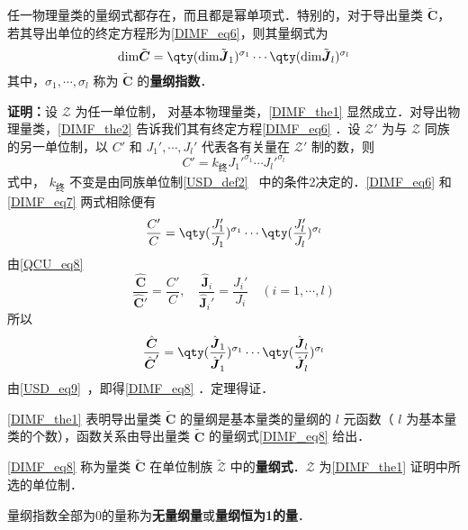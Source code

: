 \begin{theorem}{}\label{DIMF_the1}
任一物理量类的量纲式都存在，而且都是幂单项式．特别的，对于导出量类 $\tilde{\boldsymbol{C}}$，若其导出单位的终定方程形为\autoref{DIMF_eq6}，则其量纲式为
\begin{equation}\label{DIMF_eq8}
\mathrm{dim}\tilde{\boldsymbol{C}}=\qty(\mathrm{dim}\tilde{\boldsymbol{J}}_1)^{\sigma_1}\cdots\qty(\mathrm{dim}\tilde{\boldsymbol{J}}_l)^{\sigma_l}
\end{equation}
其中，$\sigma_1,\cdots,\sigma_l$ 称为 $\tilde{\boldsymbol{C}}$ 的\textbf{量纲指数}．
\end{theorem}
\textbf{证明：}设 $\mathscr{Z}$ 为任一单位制， 对基本物理量类，\autoref{DIMF_the1} 显然成立．对导出物理量类，\autoref{DIMF_the2} 告诉我们其有终定方程\autoref{DIMF_eq6} ．设 $\mathscr{Z'}$ 为与 $\mathscr{Z}$ 同族的另一单位制，以 $C'$ 和 $J_1',\cdots,J_l'$ 代表各有关量在 $\mathscr{Z'}$ 制的数，则
\begin{equation}\label{DIMF_eq7}
C'=k_{\text{终}}J_1'^{\sigma_1}\cdots J_l'^{\sigma_l}
\end{equation}
 式中， $k_{\text{终}}$ 不变是由同族单位制\autoref{USD_def2}~ 中的条件2决定的．\autoref{DIMF_eq6} 和\autoref{DIMF_eq7} 两式相除便有
 \begin{equation}
 \frac{C'}{C}=\qty(\frac{J_1'}{J_1})^{\sigma_1}\cdots\qty(\frac{J_l'}{J_l})^{\sigma_l}
 \end{equation}
 由\autoref{QCU_eq8}~
 \begin{equation}
 \frac{\hat{\boldsymbol{C}}}{\hat{\boldsymbol{C}}'}=\frac{C'}{C}, \quad\frac{\hat{\boldsymbol{J}}_i}{\hat{\boldsymbol{J}}_i'}=\frac{J_i'}{J_i}\quad (i=1,\cdots ,l)
 \end{equation}
 所以
 \begin{equation}
 \frac{\hat{\boldsymbol{C}}}{\hat{\boldsymbol{C}}'}=\qty(\frac{\hat{\boldsymbol{J}}_1}{\hat{\boldsymbol{J}}_1'})^{\sigma_1}\cdots\qty(\frac{\hat{\boldsymbol{J}}_l}{\hat{\boldsymbol{J}}_l'})^{\sigma_l}
 \end{equation}
 由\autoref{USD_eq9}~，即得\autoref{DIMF_eq8} ．定理得证．


 \autoref{DIMF_the1} 表明导出量类 $\tilde{\boldsymbol{C}}$ 的量纲是基本量类的量纲的 $l$ 元函数（ $l$ 为基本量类的个数），函数关系由导出量类 $\tilde{\boldsymbol{C}}$ 的量纲式\autoref{DIMF_eq8} 给出．

 \begin{definition}{}
 \autoref{DIMF_eq8} 称为量类 $\tilde{\boldsymbol{C}}$ 在单位制族 $\tilde{\mathscr{Z}}$ 中的\textbf{量纲式}．$\mathscr{Z}$ 为\autoref{DIMF_the1} 证明中所选的单位制．
 \end{definition}
 \begin{definition}{}
 量纲指数全部为0的量称为\textbf{无量纲量}或\textbf{量纲恒为1的量}．
 \end{definition}
